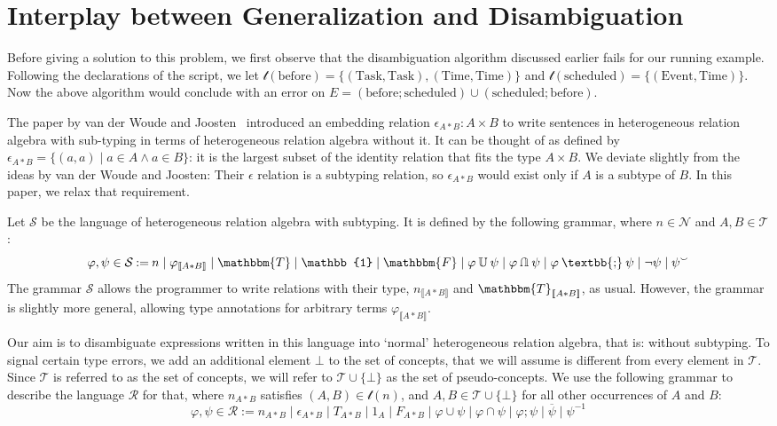 \documentclass[12pt]{article}
\newcommand{\typesemi}{\mathbin{\text{\textbb{;}}}}
\newcommand{\typeunion}{\mathbin{\mathbb{U}}}
\newcommand{\typeinter}{\mathbin{\text{\rotatebox[origin=c]{180}{$\typeunion$}}}}
\newcommand{\typevee}{\mathbbm{T}}
\newcommand{\typenil}{\mathbbm{F}}
\newcommand{\typecomp}[1]{\neg{#1}}
\newcommand{\typeconv}[1]{{#1}^\smallsmile}
\newcommand{\typeident}{\mathbb{1}}
\newcommand{\typetyped}[2]{{#1}_{\llbracket #2 \rrbracket}}
\newcommand{\conv}[1]{{#1}^{-1}}
\begin{document}
\section{Interplay between Generalization and Disambiguation}
Before giving a solution to this problem, we first observe that the disambiguation algorithm discussed earlier fails for our running example.
Following the declarations of the script, we let $\mathcal{t}(\mathrm{before}) = \{(\mathrm{Task}, \mathrm{Task}),(\mathrm{Time}, \mathrm{Time})\}$ and $\mathcal{t}(\mathrm{scheduled}) = \{(\mathrm{Event}, \mathrm{Time})\}$.
Now the above algorithm would conclude with an error on $E = (\mathrm{before};\mathrm{scheduled}) \cup (\mathrm{scheduled};\mathrm{before})$.

The paper by van der Woude and Joosten~\cite{Woude11} introduced an embedding relation $\epsilon_{A*B} : A \times B$ to write sentences in heterogeneous relation algebra with sub-typing in terms of heterogeneous relation algebra without it.
It can be thought of as defined by $\epsilon_{A*B} = \{(a,a) \mid a\in A \wedge a\in B\}$: it is the largest subset of the identity relation that fits the type $A\times B$.
We deviate slightly from the ideas by van der Woude and Joosten: Their $\epsilon$ relation is a subtyping relation, so $\epsilon_{A*B}$ would exist only if $A$ is a subtype of $B$.
In this paper, we relax that requirement.



Let $\mathcal{S}$ be the language of heterogeneous relation algebra with subtyping.
It is defined by the following grammar, where $n\in\mathcal{N}$ and $A,B\in\mathcal{T}$:
\[
\varphi,\psi\in\mathcal{S} \mathbin{:=} n \mid \typetyped{\varphi}{A*B} \mid \typevee \mid \typeident \mid \typenil \mid \varphi \typeunion \psi \mid \varphi \typeinter \psi \mid \varphi \typesemi \psi \mid \typecomp{\psi}\mid \typeconv{\psi}
\]
The grammar $\mathcal{S}$ allows the programmer to write relations with their type, $\typetyped{n}{A*B}$ and $\typetyped{\typevee}{A*B}$, as usual.
However, the grammar is slightly more general, allowing type annotations for arbitrary terms $\typetyped{\varphi}{A*B}$.

Our aim is to disambiguate expressions written in this language into `normal' heterogeneous relation algebra, that is: without subtyping.
To signal certain type errors, we add an additional element $\bot$ to the set of concepts, that we will assume is different from every element in $\mathcal{T}$.
Since $\mathcal{T}$ is referred to as the set of concepts, we will refer to $\mathcal{T}\cup\{\bot\}$ as the set of pseudo-concepts.
We use the following grammar to describe the language $\mathcal{R}$ for that, where $n_{A*B}$ satisfies $(A,B)\in \mathcal{t}(n)$, and $A,B\in\mathcal{T}\cup\{\bot\}$ for all other occurrences of $A$ and $B$:
\[
\varphi,\psi\in\mathcal{R} \mathbin{:=} n_{A*B} \mid \epsilon_{A*B} \mid T_{A*B} \mid 1_{A} \mid F_{A*B} \mid \varphi \cup \psi \mid \varphi \cap \psi \mid \varphi ; \psi \mid \overline{\psi}\mid \conv{\psi}
\]
\end{document}

